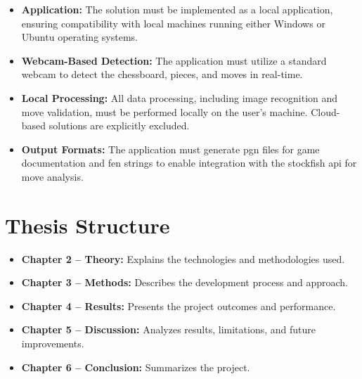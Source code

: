 \begin{itemize}
    \item \textbf{Application:} The solution must be implemented as a local application, ensuring compatibility with local machines running either Windows or Ubuntu operating systems.

    \item \textbf{Webcam-Based Detection:} The application must utilize a standard webcam to detect the chessboard, pieces, and moves in real-time.

    \item \textbf{Local Processing:} All data processing, including image recognition and move validation, must be performed locally on the user's machine. Cloud-based solutions are explicitly excluded.

    \item \textbf{Output Formats:} The application must generate \gls{pgn} files for game documentation and \gls{fen} strings to enable integration with the \gls{stockfish} \gls{api} for move analysis.
\end{itemize}

\section{Thesis Structure}

\begin{itemize}
    
    \item \textbf{Chapter 2 -- Theory:} Explains the technologies and methodologies used.
    
    \item \textbf{Chapter 3 -- Methods:} Describes the development process and approach.
    
    \item \textbf{Chapter 4 -- Results:} Presents the project outcomes and performance.
    
    \item \textbf{Chapter 5 -- Discussion:} Analyzes results, limitations, and future improvements.
    
    \item \textbf{Chapter 6 -- Conclusion:} Summarizes the project.
\end{itemize}






%     

